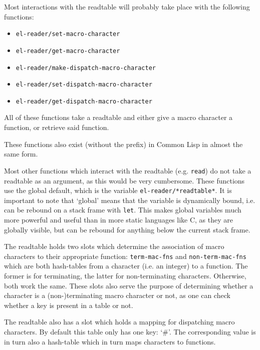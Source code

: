 \documentclass[a4paper,10pt,twoside]{report}
\newcommand{\cl}{Common Lisp}
\newcommand{\sym}[1]{\texttt{#1}}
\newcommand{\fun}[1]{\texttt{#1}}
\newcommand{\Read}{\fun{read}}
\begin{document}
Most interactions with the readtable will probably take place with the following
functions:
\begin{itemize}
\item \fun{el-reader/set-macro-character} 
\item \fun{el-reader/get-macro-character}
\item \fun{el-reader/make-dispatch-macro-character}
\item \fun{el-reader/set-dispatch-macro-character}
\item \fun{el-reader/get-dispatch-macro-character}
\end{itemize}
All of these functions take a readtable and either give a macro character a
function, or retrieve said function.

These functions also exist (without the prefix) in \cl{} in almost the same
form.\cite[Section 23.2 ``The Reader Dictionary'']{hyperspec}

Most other functions which interact with the readtable (e.g. \Read{}) do not
take a readtable as an argument, as this would be very cumbersome.  These
functions use the global default, which is the variable
\sym{el-reader/*readtable*}.  It is important to note that `global' means that
the variable is dynamically bound, i.e. can be rebound on a stack frame with
\fun{let}.  This makes global variables much more powerful and useful than in
more static languages like C, as they are globally visible, but can be rebound
for anything below the current stack frame.

The readtable holds two slots which determine the association of macro
characters to their appropriate function: \sym{term-mac-fns} and
\sym{non-term-mac-fns} which are both hash-tables from a character (i.e. an
integer) to a function.  The former is for terminating, the latter for
non-terminating characters.  Otherwise, both work the same.  These slots also
serve the purpose of determining whether a character is a (non-)terminating
macro character or not, as one can check whether a key is present in a table or
not.

The readtable also has a slot which holds a mapping for dispatching macro
characters.  By default this table only has one key: `\#'.  The corresponding
value is in turn also a hash-table which in turn maps characters to functions.
\end{document}
